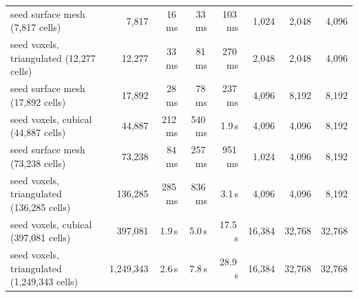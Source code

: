 \begin{tabular}{lrrrrrrr}
seed surface mesh (7,817 cells) & 7,817 & 16\,ms & 33\,ms & 103\,ms & 1,024 & 2,048 & 4,096 \\
seed voxels, triangulated (12,277 cells) & 12,277 & 33\,ms & 81\,ms & 270\,ms & 2,048 & 2,048 & 4,096 \\
seed surface mesh (17,892 cells) & 17,892 & 28\,ms & 78\,ms & 237\,ms & 4,096 & 8,192 & 8,192 \\
seed voxels, cubical (44,887 cells) & 44,887 & 212\,ms & 540\,ms & 1.9\,s & 4,096 & 4,096 & 8,192 \\
seed surface mesh (73,238 cells) & 73,238 & 84\,ms & 257\,ms & 951\,ms & 1,024 & 4,096 & 8,192 \\
seed voxels, triangulated (136,285 cells) & 136,285 & 285\,ms & 836\,ms & 3.1\,s & 4,096 & 4,096 & 8,192 \\
seed voxels, cubical (397,081 cells) & 397,081 & 1.9\,s & 5.0\,s & 17.5\,s & 16,384 & 32,768 & 32,768 \\
seed voxels, triangulated (1,249,343 cells) & 1,249,343 & 2.6\,s & 7.8\,s & 28.9\,s & 16,384 & 32,768 & 32,768 \\
\bottomrule
\end{tabular}

